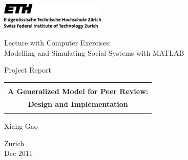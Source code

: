 
\thispagestyle{empty}

\begin{center}
\includegraphics[width=5cm]{ETHlogo.eps}

\bigskip


\bigskip


\bigskip


\LARGE{ 	Lecture with Computer Exercises:\\ }
\LARGE{ Modelling and Simulating Social Systems with MATLAB\\}

\bigskip

\bigskip

\small{Project Report}\\

\bigskip

\bigskip

\bigskip

\bigskip


\begin{tabular}{|c|}
\hline
\\
\textbf{\LARGE{A Generalized Model for Peer Review:}}\\
\textbf{\LARGE{Design and Implementation}}\\
\\
\hline
\end{tabular}
\bigskip

\bigskip

\bigskip

\LARGE{Xiang Gao}



\bigskip

\bigskip

\bigskip

\bigskip

\bigskip

\bigskip

\bigskip

\bigskip

Zurich\\
Dec 2011\\

\end{center}


